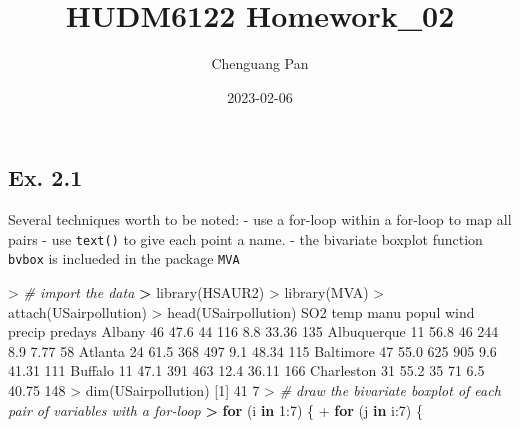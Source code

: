 \documentclass[
]{article}
\title{HUDM6122 Homework\_02}
\author{Chenguang Pan}
\date{2023-02-06}
\newenvironment{Shaded}{\begin{snugshade}}{\end{snugshade}}
\newcommand{\CommentTok}[1]{\textcolor[rgb]{0.56,0.35,0.01}{\textit{#1}}}
\newcommand{\ControlFlowTok}[1]{\textcolor[rgb]{0.13,0.29,0.53}{\textbf{#1}}}
\newcommand{\DecValTok}[1]{\textcolor[rgb]{0.00,0.00,0.81}{#1}}
\newcommand{\ErrorTok}[1]{\textcolor[rgb]{0.64,0.00,0.00}{\textbf{#1}}}
\newcommand{\FloatTok}[1]{\textcolor[rgb]{0.00,0.00,0.81}{#1}}
\newcommand{\FunctionTok}[1]{\textcolor[rgb]{0.00,0.00,0.00}{#1}}
\newcommand{\NormalTok}[1]{#1}
\newcommand{\SpecialCharTok}[1]{\textcolor[rgb]{0.00,0.00,0.00}{#1}}
\begin{document}
\maketitle

\hypertarget{ex.-2.1}{%
\subsection{Ex. 2.1}\label{ex.-2.1}}

Several techniques worth to be noted: - use a for-loop within a for-loop
to map all pairs - use \texttt{text()} to give each point a name. - the
bivariate boxplot function \texttt{bvbox} is inclueded in the package
\texttt{MVA}

\begin{Shaded}
\begin{Highlighting}[]
\SpecialCharTok{\textgreater{}} \CommentTok{\# import the data}
\ErrorTok{\textgreater{}} \FunctionTok{library}\NormalTok{(HSAUR2)}
\SpecialCharTok{\textgreater{}} \FunctionTok{library}\NormalTok{(MVA)}
\SpecialCharTok{\textgreater{}} \FunctionTok{attach}\NormalTok{(USairpollution)}
\SpecialCharTok{\textgreater{}} \FunctionTok{head}\NormalTok{(USairpollution)}
\NormalTok{            SO2 temp manu popul wind precip predays}
\NormalTok{Albany       }\DecValTok{46} \FloatTok{47.6}   \DecValTok{44}   \DecValTok{116}  \FloatTok{8.8}  \FloatTok{33.36}     \DecValTok{135}
\NormalTok{Albuquerque  }\DecValTok{11} \FloatTok{56.8}   \DecValTok{46}   \DecValTok{244}  \FloatTok{8.9}   \FloatTok{7.77}      \DecValTok{58}
\NormalTok{Atlanta      }\DecValTok{24} \FloatTok{61.5}  \DecValTok{368}   \DecValTok{497}  \FloatTok{9.1}  \FloatTok{48.34}     \DecValTok{115}
\NormalTok{Baltimore    }\DecValTok{47} \FloatTok{55.0}  \DecValTok{625}   \DecValTok{905}  \FloatTok{9.6}  \FloatTok{41.31}     \DecValTok{111}
\NormalTok{Buffalo      }\DecValTok{11} \FloatTok{47.1}  \DecValTok{391}   \DecValTok{463} \FloatTok{12.4}  \FloatTok{36.11}     \DecValTok{166}
\NormalTok{Charleston   }\DecValTok{31} \FloatTok{55.2}   \DecValTok{35}    \DecValTok{71}  \FloatTok{6.5}  \FloatTok{40.75}     \DecValTok{148}
\SpecialCharTok{\textgreater{}} \FunctionTok{dim}\NormalTok{(USairpollution)}
\NormalTok{[}\DecValTok{1}\NormalTok{] }\DecValTok{41}  \DecValTok{7}
\SpecialCharTok{\textgreater{}} \CommentTok{\# draw the bivariate boxplot of each pair of variables with a for{-}loop}
\ErrorTok{\textgreater{}} \ControlFlowTok{for}\NormalTok{ (i }\ControlFlowTok{in} \DecValTok{1}\SpecialCharTok{:}\DecValTok{7}\NormalTok{) \{}
\SpecialCharTok{+}   \ControlFlowTok{for}\NormalTok{ (j }\ControlFlowTok{in}\NormalTok{ i}\SpecialCharTok{:}\DecValTok{7}\NormalTok{) \{}

\end{Highlighting}
\end{Shaded}
\end{document}
